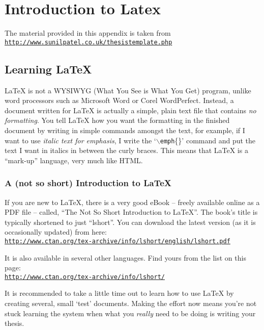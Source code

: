 
\chapter{Introduction to Latex}
\label{AppendixA}

The material provided in this appendix is taken from \\
\href{http://www.sunilpatel.co.uk/thesistemplate.php}{\texttt{http://www.sunilpatel.co.uk/thesistemplate.php}}

\section{Learning \LaTeX{}}

\LaTeX{} is not a WYSIWYG (What You See is What You Get) program, unlike word processors such as Microsoft Word or Corel WordPerfect. Instead, a document written for \LaTeX{} is actually a simple, plain text file that contains \emph{no formatting}. You tell \LaTeX{} how you want the formatting in the finished document by writing in simple commands amongst the text, for example, if I want to use \emph{italic text for emphasis}, I write the `$\backslash$\texttt{emph}\{\}' command and put the text I want in italics in between the curly braces. This means that \LaTeX{} is a ``mark-up'' language, very much like HTML.

\subsection{A (not so short) Introduction to \LaTeX{}}

If you are new to \LaTeX{}, there is a very good eBook -- freely available online as a PDF file -- called, ``The Not So Short Introduction to \LaTeX{}''. The book's title is typically shortened to just ``lshort''. You can download the latest version (as it is occasionally updated) from here:\\
\href{http://www.ctan.org/tex-archive/info/lshort/english/lshort.pdf}{\texttt{http://www.ctan.org/tex-archive/info/lshort/english/lshort.pdf}}

It is also available in several other languages. Find yours from the list on this page:\\
\href{http://www.ctan.org/tex-archive/info/lshort/}{\texttt{http://www.ctan.org/tex-archive/info/lshort/}}

It is recommended to take a little time out to learn how to use \LaTeX{} by creating several, small `test' documents. Making the effort now means you're not stuck learning the system when what you \emph{really} need to be doing is writing your thesis.

